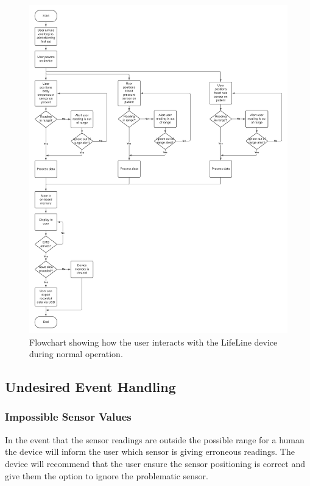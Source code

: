 \documentclass{article}
\begin{document}
	
	\begin{figure}[!htb]
    	\centering
    	\includegraphics[width=1 \linewidth]{LifeLine block diagrams - Page 3.png}
    	\caption{Flowchart showing how the user interacts with the LifeLine device during normal operation. }
    	\label{flowchart}
    \end{figure}

	\subsection{Undesired Event Handling}
	\subsubsection{Impossible Sensor Values}
	In the event that the sensor readings are outside the possible range for a human the device will inform the user which sensor is giving erroneous readings. The device will recommend that the user ensure the sensor positioning is correct and give them the option to ignore the problematic sensor. 
	
\end{document}
